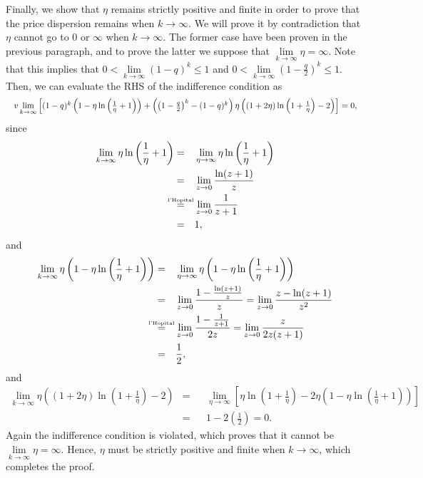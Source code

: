 \documentclass[12pt]{article}
\newcommand*{\Resize}
[2]{\resizebox{\textwidth}{!}{$#2$}}
\newcommand\myeq{\mathrel{\stackrel{\makebox[0pt]{\mbox{\normalfont\tiny
					l'Hopital}}}{=}}}
\begin{document}
Finally, we show that $\eta$ remains strictly positive and finite in order to 
prove that the price dispersion remains when $k \to \infty$.  We will prove it 
by contradiction that $\eta$ cannot go to $0$ or $\infty$ when $k \to \infty$.  
The former case have been proven in the previous paragraph, and to prove the 
latter we suppose that $\lim\limits_{k \to \infty} \eta =\infty$.  Note that 
this implies that $0<\lim\limits_{k\to \infty}(1-q)^k \leq 1$ and  
$0<\lim\limits_{k\to \infty}\left(1-\frac{q}{2}\right)^k \leq 1$.  Then, we 
can evaluate the RHS of the indifference condition as
\begin{equation*}
\Resize{}{
	v\lim\limits_{k \to \infty}\left[(1-q)^k\left(1 - \eta 
	\ln\left(\frac{1}{\eta}+1\right)\right) + 
	\left(\left(1-\frac{q}{2}\right)^k 
	-(1-q)^k\right)\eta\left((1+2\eta)\ln\left(1+\frac{1}{\eta}\right) 
	-2\right)\right]=0,
}
\end{equation*}
since
\begin{equation*}
\begin{aligned}
\lim\limits_{k\to\infty}\eta\ln\left(\frac{1}{\eta}+1\right) &=&& 
\lim\limits_{\eta\to \infty}\eta\ln\left(\frac{1}{\eta}+1\right)\\
&=&&\lim\limits_{z\to 0}\frac{\ln(z+1)}{z}\\
&\myeq && \lim\limits_{z\to 0}\frac{1}{z+1}\\
& = && 1,
\end{aligned}
\end{equation*}
and
\begin{equation*}
\begin{aligned}
\lim\limits_{k\to\infty}\eta\left(1 - 
\eta\ln\left(\frac{1}{\eta}+1\right)\right) &=&& 
\lim\limits_{\eta\to \infty}\eta\left(1 - 
\eta\ln\left(\frac{1}{\eta}+1\right)\right)\\
&=&&\lim\limits_{z\to 0}\frac{1 - \frac{\ln(z+1)}{z}}{z} = 
\lim\limits_{z\to 0}\frac{z - \ln(z+1)}{z^2}\\
&\myeq && \lim\limits_{z\to 0}\frac{1 - \frac{1}{z+1}}{2z} = 
\lim\limits_{z\to 0}\frac{z}{2z(z+1)}\\
& = && \frac{1}{2},
\end{aligned}
\end{equation*}
and
\begin{equation*}
\begin{aligned}
\lim\limits_{k\to\infty}\eta\left((1+2\eta)\ln\left(1+\frac{1}{\eta}\right) 
-2\right) &=&& 
\lim\limits_{\eta\to \infty}\left[\eta\ln\left(1+\frac{1}{\eta}\right) - 2 
\eta\left(1 - \eta\ln\left(\frac{1}{\eta}+1\right)\right)\right]\\
&=&&1 - 2\left(\frac{1}{2}\right) = 0.
\end{aligned}
\end{equation*}
Again the indifference condition is violated, which proves that it cannot be 
$\lim\limits_{k\to\infty}\eta = \infty$.  Hence, $\eta$ must be strictly 
positive and finite when $k \to \infty$, which completes the proof.
\end{document}
